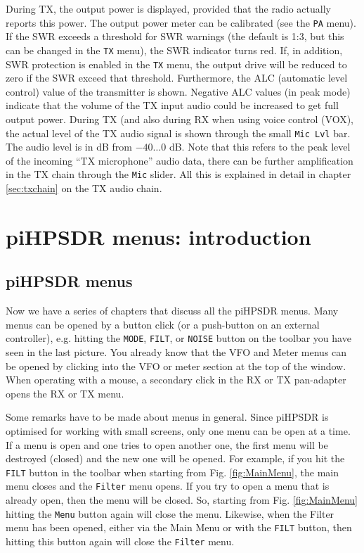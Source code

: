 \documentclass[12pt]{book}
\def\rett#1{\texttt{\color{red}#1}}
\def\bltt#1{\texttt{\color{blue}#1}}
\def\pH{pi\-HPSDR\xspace}
\begin{document}
During TX, the output power is displayed, provided that the radio actually
reports this power. The output power meter can be calibrated (see the \bltt{PA}
menu). If the SWR exceeds a threshold for SWR warnings (the default is 1:3, but
this can be changed in the \bltt{TX} menu), the SWR indicator turns red. If,
in addition, SWR protection is enabled in the \bltt{TX} menu, the output
drive  will be reduced to zero if the SWR exceed that threshold.
Furthermore, the ALC (automatic level control) value of the transmitter is
shown. Negative ALC values (in peak mode) indicate that the volume of the TX input audio
could be increased to get full output  power. During TX (and also during RX when using
voice control (VOX), the actual level of the TX audio  signal is shown through
the small \rett{Mic Lvl} bar. The audio level is in dB from $-40\ldots0$ dB. Note that
this refers to the peak level of the  incoming ``TX microphone'' audio data, there can
be further amplification in the TX  chain through the \bltt{Mic} slider. All this
is explained in detail in chapter \ref{sec:txchain} on the TX audio chain.



\chapter{\pH menus: introduction}

\section{\pH menus}
Now we have a series of chapters that discuss all the \pH menus. Many menus can be
opened by a button click (or a push-button on an external controller), e.g. hitting the
\rett{MODE}, \rett{FILT}, or \rett{NOISE} button on the
toolbar you have seen in the last picture. You already know that the VFO and Meter
menus can be opened by clicking into the VFO or meter section at the top of the window.
When operating with a mouse, a secondary click in the RX or TX pan-adapter opens the
RX or TX menu.

Some remarks have to be made about menus in general. Since \pH is optimised for
working with small screens, only one menu can be open at a time. If a menu is open
and one tries to open another one, the first menu will be destroyed (closed) and the
new one will be opened. For example, if you hit the \rett{FILT} button in the toolbar
when starting from Fig. \ref{fig:MainMenu}, the main menu closes and the \bltt{Filter} menu
opens. If you try to open a menu that is already open, then the menu will be closed.
So, starting from Fig. \ref{fig:MainMenu} hitting the \rett{Menu} button again will close
the menu. Likewise, when the Filter menu has been opened, either via the Main Menu
or with the \rett{FILT} button, then hitting this button again will close the
\bltt{Filter} menu.
\end{document}
